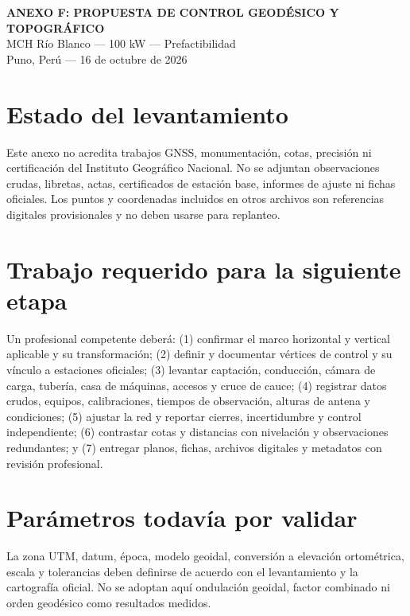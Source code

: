 \documentclass[11pt,a4paper]{article}
\begin{document}
\begin{center}
{\Large\bfseries\color{navy} ANEXO F: PROPUESTA DE CONTROL GEODÉSICO Y TOPOGRÁFICO}\\[0.5em]
{\large MCH Río Blanco — 100 kW — Prefactibilidad}\\[0.5em]
{\normalsize Puno, Perú — 16 de octubre de 2026}
\end{center}
\section*{Estado del levantamiento}
Este anexo no acredita trabajos GNSS, monumentación, cotas, precisión ni certificación del Instituto Geográfico Nacional. No se adjuntan observaciones crudas, libretas, actas, certificados de estación base, informes de ajuste ni fichas oficiales. Los puntos y coordenadas incluidos en otros archivos son referencias digitales provisionales y no deben usarse para replanteo.
\section*{Trabajo requerido para la siguiente etapa}
Un profesional competente deberá: (1) confirmar el marco horizontal y vertical aplicable y su transformación; (2) definir y documentar vértices de control y su vínculo a estaciones oficiales; (3) levantar captación, conducción, cámara de carga, tubería, casa de máquinas, accesos y cruce de cauce; (4) registrar datos crudos, equipos, calibraciones, tiempos de observación, alturas de antena y condiciones; (5) ajustar la red y reportar cierres, incertidumbre y control independiente; (6) contrastar cotas y distancias con nivelación y observaciones redundantes; y (7) entregar planos, fichas, archivos digitales y metadatos con revisión profesional.
\section*{Parámetros todavía por validar}
La zona UTM, datum, época, modelo geoidal, conversión a elevación ortométrica, escala y tolerancias deben definirse de acuerdo con el levantamiento y la cartografía oficial. No se adoptan aquí ondulación geoidal, factor combinado ni orden geodésico como resultados medidos.
\end{document}
